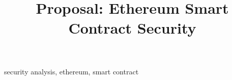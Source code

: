 \documentclass[conference]{IEEEtran}
\begin{document}
\title{Proposal: Ethereum Smart Contract Security}

\author{
}

\maketitle



\begin{IEEEkeywords}
    security analysis, ethereum, smart contract
\end{IEEEkeywords}

 
   
 


\balance

\end{document}
